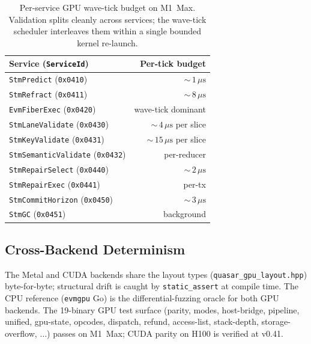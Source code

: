 \begin{table}[ht]
\centering
\begin{tabular}{@{}lr@{}}
\toprule
\textbf{Service} (\texttt{ServiceId}) & \textbf{Per-tick budget} \\
\midrule
\texttt{StmPredict} (\texttt{0x0410})      & ${\sim}\,1\,\mu\text{s}$ \\
\texttt{StmRefract} (\texttt{0x0411})      & ${\sim}\,8\,\mu\text{s}$ \\
\texttt{EvmFiberExec} (\texttt{0x0420})    & wave-tick dominant \\
\texttt{StmLaneValidate} (\texttt{0x0430}) & ${\sim}\,4\,\mu\text{s}$ per slice \\
\texttt{StmKeyValidate} (\texttt{0x0431})  & ${\sim}\,15\,\mu\text{s}$ per slice \\
\texttt{StmSemanticValidate} (\texttt{0x0432}) & per-reducer \\
\texttt{StmRepairSelect} (\texttt{0x0440}) & ${\sim}\,2\,\mu\text{s}$ \\
\texttt{StmRepairExec} (\texttt{0x0441})   & per-tx \\
\texttt{StmCommitHorizon} (\texttt{0x0450})& ${\sim}\,3\,\mu\text{s}$ \\
\texttt{StmGC} (\texttt{0x0451})           & background \\
\bottomrule
\end{tabular}
\caption{Per-service GPU wave-tick budget on M1~Max. Validation
splits cleanly across services; the wave-tick scheduler
\cite{lp132-quasarexec} interleaves them within a single bounded
kernel re-launch.}
\label{tab:service-latency}
\end{table}

\subsection{Cross-Backend Determinism}

The Metal and CUDA backends share the layout types
(\texttt{quasar\_gpu\_layout.hpp}) byte-for-byte; structural drift is
caught by \texttt{static\_assert} at compile time. The CPU reference
(\texttt{evmgpu} Go) is the differential-fuzzing oracle for both GPU
backends. The 19-binary GPU test surface
(parity, modes, host-bridge, pipeline, unified, gpu-state, opcodes,
dispatch, refund, access-list, stack-depth, storage-overflow, $\ldots$)
passes on M1~Max; CUDA parity on H100 is verified at v0.41.


